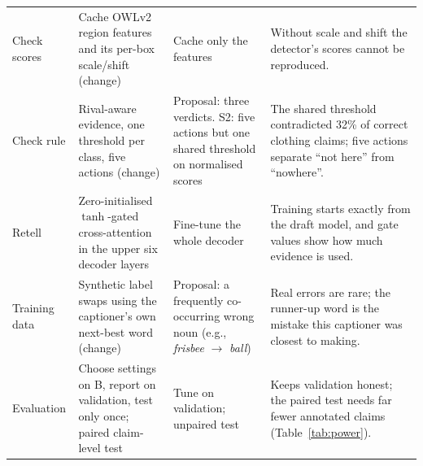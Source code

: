 \documentclass[conference]{IEEEtran}
\begin{document}
\begin{table}[t]
\begin{tabular}{@{}>{\raggedright\arraybackslash}p{1.5cm}>{\raggedright\arraybackslash}p{5.0cm}>{\raggedright\arraybackslash}p{3.9cm}>{\raggedright\arraybackslash}p{6.2cm}@{}}
Check scores & Cache OWLv2 region features and its per-box scale/shift (change) & Cache only the features &
Without scale and shift the detector's scores cannot be reproduced. \\
Check rule & Rival-aware evidence, one threshold per class, five actions (change) & Proposal: three verdicts.
S2: five actions but one shared threshold on normalised scores & The shared threshold contradicted 32\% of
correct clothing claims; five actions separate ``not here'' from ``nowhere''. \\
Retell & Zero-initialised $\tanh$-gated cross-attention in the upper six decoder layers & Fine-tune the
whole decoder & Training starts exactly from the draft model, and gate values show how much evidence is
used. \\
Training data & Synthetic label swaps using the captioner's own next-best word (change) & Proposal: a
frequently co-occurring wrong noun (e.g., \emph{frisbee} $\to$ \emph{ball}) & Real errors are rare; the
runner-up word is the mistake this captioner was closest to making. \\
Evaluation & Choose settings on B, report on validation, test only once; paired claim-level test & Tune on
validation; unpaired test & Keeps validation honest; the paired test needs far fewer annotated claims
(Table~\ref{tab:power}). \\
\bottomrule
\end{tabular}
\end{table}
\end{document}
